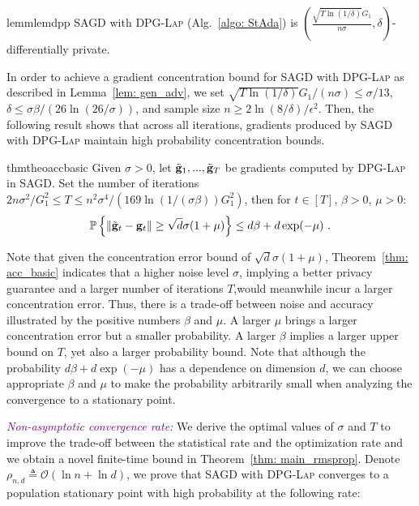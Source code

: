 \documentclass[11pt]{article}
\begin{document}
\begin{restatable}{lemm}{lemdpp}
\label{lemma dpp}
\textsc{SAGD} with \textsc{DPG-Lap} (Alg.~\ref{algo: StAda}) is $(\frac{\sqrt{T \ln(1/\delta)} G_1}{n\sigma}, \delta)$-differentially private. 
\end{restatable}  
In order to achieve a gradient concentration bound for \textsc{SAGD} with \textsc{DPG-Lap} as described in Lemma~\ref{lem: gen_adv}, we set $\sqrt{T \ln(1/\delta)} G_1/(n\sigma)\leq \sigma/13$, $\delta \leq \sigma \beta/(26 \ln(26/\sigma))$, and  sample size $n \geq 2\ln(8/\delta)/\epsilon^2$. 
Then, the following result shows that across all iterations, gradients produced by \textsc{SAGD} with \textsc{DPG-Lap} maintain high probability concentration bounds.

\begin{restatable}{thm}{theoaccbasic}
\label{thm: acc_basic}
Given $\sigma > 0$, let $\tilde {\mathbf{g}}_1,...,  \tilde {\mathbf{g}}_T$ be gradients computed by \textsc{DPG-Lap} in \textsc{SAGD}. Set the number of iterations $ 2n\sigma^2/G_1^2\leq T \leq n^2 \sigma^4/(169 \ln(1/(\sigma \beta))G_1^2)$, then for $t \in [T]$, $\beta >0$, $\mu > 0$:
    \begin{equation*}
    \mathbb{P}\left\{\|\tilde {\mathbf{g}}_t - \mathbf{g}_t\| \geq \sqrt{d}\sigma(1+\mu)\right\} \leq d\beta + d\exp(-\mu)~.
    \end{equation*}
\end{restatable}
Note that given the concentration error bound of $\sqrt{d}\sigma(1+\mu)$, Theorem~\ref{thm: acc_basic} indicates that a higher noise level $\sigma$, implying a better privacy guarantee and a larger number of iterations $T$,would meanwhile incur a larger concentration error.
Thus, there is a trade-off between noise and accuracy illustrated by the positive numbers $\beta$ and $\mu$.
A larger $\mu$ brings a larger concentration error but a smaller probability. 
A larger $\beta$ implies a larger upper bound on $T$, yet also a larger probability bound. 
Note that although the probability $d\beta + d\exp(-\mu)$ has a dependence on dimension $d$, we can choose appropriate $\beta$ and $\mu$ to make the probability arbitrarily small when analyzing the convergence to a stationary point.

\textcolor{purple}{\textit{Non-asymptotic convergence rate:}}
We derive the optimal values of $\sigma$ and $T$ to improve the trade-off between the statistical rate and the optimization rate and we obtain a novel finite-time bound in Theorem~\ref{thm: main_rmsprop}. 
Denote $\rho_{n,d} \triangleq\mathcal{O} \left(\ln n + \ln d\right)$, we prove that \textsc{SAGD} with \textsc{DPG-Lap} converges to a population stationary point with high probability at the following rate:
\end{document}
